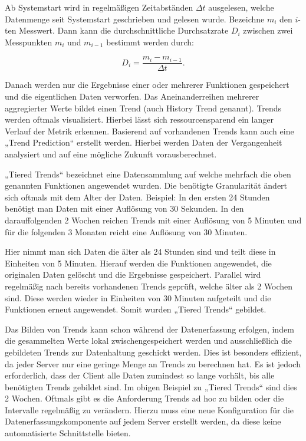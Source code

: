 Ab Systemstart wird in regelmäßigen Zeitabständen $\Delta t$ ausgelesen, welche
Datenmenge seit Systemstart geschrieben und gelesen wurde. Bezeichne $m_i$ den
$i$-ten Messwert. Dann kann die durchschnittliche Durchsatzrate $D_i$ zwischen
zwei Messpunkten $m_i$ und $m_{i-1}$ bestimmt werden durch:

\[ D_i = \frac{m_{i} - m_{i-1}}{\Delta t}.\]

Danach werden nur die Ergebnisse einer oder mehrerer Funktionen gespeichert und
die eigentlichen Daten verworfen. Das Aneinanderreihen mehrerer aggregierter
Werte bildet einen Trend (auch History Trend genannt). Trends werden oftmals
visualisiert. Hierbei lässt sich ressourcensparend ein langer Verlauf der
Metrik erkennen. Basierend auf vorhandenen Trends kann auch eine „Trend
Prediction“ erstellt werden. Hierbei werden Daten der Vergangenheit analysiert
und auf eine mögliche Zukunft vorausberechnet.

„Tiered Trends“ bezeichnet eine Datensammlung auf welche mehrfach die oben
genannten Funktionen angewendet wurden. Die benötigte Granularität ändert sich
oftmals mit dem Alter der Daten. Beispiel: In den ersten 24 Stunden benötigt
man Daten mit einer Auflösung von 30 Sekunden. In den darauffolgenden 2 Wochen
reichen Trends mit einer Auflösung von 5 Minuten und für die folgenden 3
Monaten reicht eine Auflösung von 30 Minuten.

Hier nimmt man sich Daten die älter als 24 Stunden sind und teilt diese in
Einheiten von 5 Minuten. Hierauf werden die Funktionen angewendet, die
originalen Daten gelöscht und die Ergebnisse gespeichert. Parallel wird
regelmäßig nach bereits vorhandenen Trends geprüft, welche älter als 2 Wochen
sind. Diese werden wieder in Einheiten von 30 Minuten aufgeteilt und die
Funktionen erneut angewendet. Somit wurden „Tiered Trends“ gebildet.

Das Bilden von Trends kann schon während der Datenerfassung erfolgen, indem die
gesammelten Werte lokal zwischengespeichert werden und ausschließlich die
gebildeten Trends zur Datenhaltung geschickt werden. Dies ist besonders
effizient, da jeder Server nur eine geringe Menge an Trends zu berechnen hat.
Es ist jedoch erforderlich, dass der Client alle Daten zumindest so lange
vorhält, bis alle benötigten Trends gebildet sind. Im obigen Beispiel zu
„Tiered Trends“ sind dies 2 Wochen. Oftmals gibt es die Anforderung Trends ad
hoc zu bilden oder die Intervalle regelmäßig zu verändern. Hierzu muss eine
neue Konfiguration für die Datenerfassungskomponente auf jedem Server erstellt
werden, da diese keine automatisierte Schnittstelle bieten.

